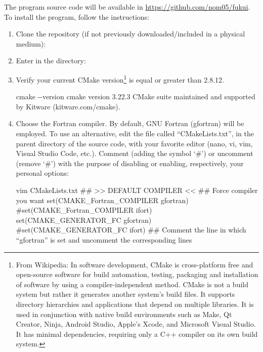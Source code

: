 \documentclass[a4paper,11pt,openany]{memoir}
\begin{document}

The program source code will be available in \url{https://github.com/nom05/fukui}. To install the program, follow the instructions:
\begin{enumerate}
	\item Clone the repository (if not previously downloaded/included in a physical medium):
	\item Enter in the directory:
	\item Verify your current CMake version\footnote{From Wikipedia: In software development, CMake is cross-platform free and open-source software for build automation, testing, packaging and installation of software by using a compiler-independent method. CMake is not a build system but rather it generates another system's build files. It supports directory hierarchies and applications that depend on multiple libraries. It is used in conjunction with native build environments such as Make, Qt Creator, Ninja, Android Studio, Apple's Xcode, and Microsoft Visual Studio. It has minimal dependencies, requiring only a C++ compiler on its own build system.} is equal or greater than 2.8.12.
		\begin{consola}{cmake -{}-version}
cmake version 3.22.3
CMake suite maintained and supported by Kitware (kitware.com/cmake).
\end{consola}
	\item Choose the Fortran compiler. By default, GNU Fortran (gfortran) will be employed. To use an alternative, edit the file called ``CMakeLists.txt'', in the parent directory of the source code, with your favorite editor (nano, vi, vim, Visual Studio Code, etc.). Comment (adding the symbol `\#') or uncomment (remove `\#') with the purpose of disabling or enabling, respectively, your personal options:
		\begin{consola}{vim CMakeLists.txt}
## >> DEFAULT COMPILER << ## Force compiler you want
set(CMAKE\_Fortran\_COMPILER gfortran)
#set(CMAKE\_Fortran\_COMPILER ifort)
set(CMAKE\_GENERATOR\_FC gfortran)
#set(CMAKE\_GENERATOR\_FC ifort)
## Comment the line in which ``gfortran'' is set and uncomment the corresponding lines

\end{consola}
\end{enumerate}
\end{document}
